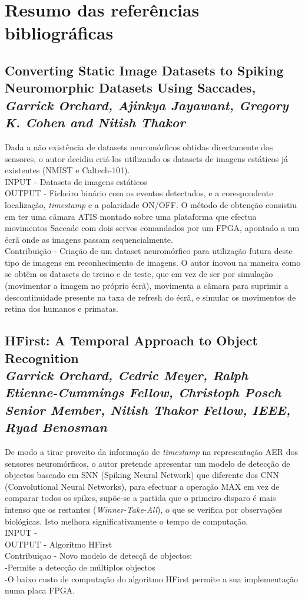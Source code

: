 \documentclass{article}
\begin{document}
\section{Resumo das referências bibliográficas}

\subsection{Converting Static Image Datasets to Spiking Neuromorphic Datasets
Using Saccades,\\ \textit{Garrick Orchard, Ajinkya Jayawant, Gregory K. Cohen and Nitish Thakor}}
Dada a não existência de datasets neuromórficos obtidas directamente dos sensores, o autor decidiu criá-los utilizando os datasets de imagens estáticos já existentes (NMIST e Caltech-101).
\\INPUT - Datasets de imagens estáticos
\\OUTPUT - Ficheiro binário com os eventos detectados, e a corespondente localização, \textit{timestamp} e a polaridade ON/OFF.
O método de obtenção consistiu em ter uma câmara ATIS montado sobre uma plataforma que efectua movimentos Saccade com dois servos comandados por um FPGA, apontado a um écrã onde as imagens passam sequencialmente.
\\Contribuição - Criação de um dataset neuromórfico para utilização futura deste tipo de imagens em reconhecimento de imagens. O autor inovou na maneira como se obtêm os datasets de treino e de teste, que em vez de ser por simulação (movimentar a imagem no próprio écrã), movimenta a câmara para suprimir a descontinuidade presente na taxa de refresh do écrã, e simular os movimentos de retina dos humanos e primatas.


\subsection{HFirst: A Temporal Approach to Object Recognition \\ \textit{Garrick Orchard, Cedric Meyer, Ralph Etienne-Cummings Fellow, Christoph Posch Senior Member, Nitish Thakor Fellow, IEEE, Ryad Benosman
}}
De modo a tirar proveito da informação de \textit{timestamp} na representação AER dos sensores neuromórficos, o autor pretende apresentar um modelo de detecção de objectos baseado em SNN (Spiking Neural Network) que diferente dos CNN (Convolutional Neural Networks), para efectuar a operação MAX em vez de comparar todos os spikes, supõe-se a partida que o primeiro disparo é mais intenso que os restantes (\textit{Winner-Take-All}), o que se verifica por observações biológicas. Isto melhora significativamente o tempo de computação.
\\INPUT - 
\\OUTPUT - Algoritmo HFirst
\\Contribuiçao - Novo modelo de detecçã de objectos: 
\\-Permite a detecção de múltiplos objectos
\\-O baixo custo de computação do algoritmo HFirst permite a sua implementação numa placa FPGA. 
\end{document}
